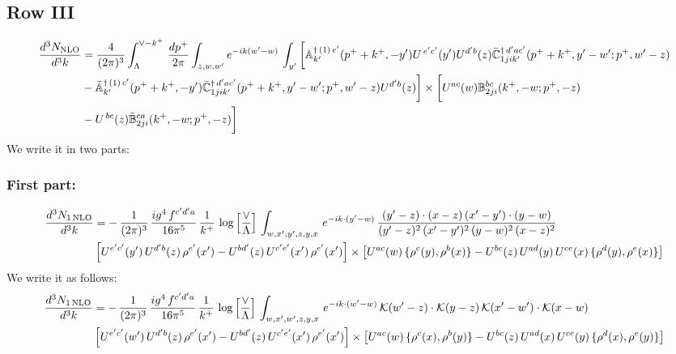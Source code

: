 \documentclass[9pt]{article}
\def\mf#1{\mathbb{#1}}
\numberwithin{equation}{section}
\begin{document}
 \subsection{Row III}
 \begin{align}
    \frac{d^{3}N_{\rm NLO}}{d^{3}k} & =   \frac{4}{(2\pi)^{3}} \int_{\Lambda}^{\vee -k^{+}}\, \frac{dp^{+}}{2\pi}\int_{z,w,w^{\prime}} e^{-ik(w^{\prime}-w)}\,\int_{y^{\prime}}\bigg[\mf{A}^{\dagger\, (1)\,e^{\prime}}_{k^{\prime}}(p^{+}+k^{+},-y^{\prime})U^{\, e^{\prime}c^{\prime}}(y^{\prime})U^{d^{\prime}b}(z) \Bar{\mf{C}}^{\dagger\, d^{\prime}ac^{\prime}}_{1jik^{\prime}}(p^{+}+k^{+},y^{\prime}-w^{\prime}; p^{+},w^{\prime}-z)\notag \\ &  -\Bar{\mf{A}}^{\dagger\, (1)\,c^{\prime}}_{k^{\prime}}(p^{+}+k^{+},-y^{\prime}) \Bar{\mf{C}}^{\dagger\, d^{\prime}ac^{\prime}}_{1jik^{\prime}}(p^{+}+k^{+},y^{\prime}-w^{\prime}; p^{+},w^{\prime}-z)U^{d^{\prime}b}(z)\bigg] \times \bigg[U^{ac}(w) \mf{B}^{bc}_{2ji}(k^{+},-w;p^{+},-z)\notag \\ &  -U^{\, bc}(z)\Bar{\mf{B}}^{ca}_{2ji}(k^{+},-w; p^{+},-z)\bigg]\nonumber
\end{align}
We write it in two parts:
\subsubsection{First part:}
\begin{align}
     \frac{d^{3}N_{1\,\rm NLO}}{d^{3}k} & = -\,\frac{1}{(2\pi)^{3}}\, \frac{ig^{4}\,f^{c'd'a}}{16\pi^{5}}\, \frac{1}{k^{+}}\,\log{\left[\frac{\vee}{\Lambda}\right]}\, \int_{w,x',y',z,y,x}\, e^{-ik\cdot (y'-w)}\,\frac{(y'-z)\cdot (x-z)\,(x'-y')\cdot (y-w)}{(y'-z)^{2}\,(x'-y')^{2}\,(y-w)^{2}\,(x-z)^{2}}\notag \\ &  \left[U^{e'c'}(y')\,U^{d'b}(z)\,\rho^{e'}(x')-U^{bd'}(z)\,U^{c'e'}(x')\,\rho^{e'}(x')\right]\times  \left[U^{ac}(w)\, \{\rho^{c}(y),\rho^{b}(x)\}-U^{bc}(z)\,U^{ad}(y)\,U^{ce}(x)\,\{\rho^{d}(y),\rho^{e}(x)\}\right]
\end{align} 
We write it as follows:
\begin{align}
     \frac{d^{3}N_{1\,\rm NLO}}{d^{3}k} & = -\,\frac{1}{(2\pi)^{3}}\, \frac{ig^{4}\,f^{c'd'a}}{16\pi^{5}}\, \frac{1}{k^{+}}\,\log{\left[\frac{\vee}{\Lambda}\right]}\, \int_{w,x',w',z,y,x}\, e^{-ik\cdot (w'-w)}\,\mathcal{K}(w'-z)\cdot \mathcal{K}(y-z)\,\mathcal{K}(x'-w')\cdot \mathcal{K}(x-w)\notag \\ &  \left[U^{e'c'}(w')\,U^{d'b}(z)\,\rho^{e'}(x')-U^{bd'}(z)\,U^{c'e'}(x')\,\rho^{e'}(x')\right]\times  \left[U^{ac}(w)\, \{\rho^{c}(x),\rho^{b}(y)\}-U^{bc}(z)\,U^{ad}(x)\,U^{ce}(y)\,\{\rho^{d}(x),\rho^{e}(y)\}\right]
\end{align} 
\end{document}
